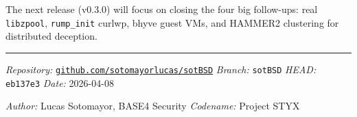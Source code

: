 \documentclass[11pt,a4paper]{article}
\begin{document}
The next release (v0.3.0) will focus on closing the four big
follow-ups: real \texttt{libzpool}, \texttt{rump\_init} curlwp,
bhyve guest VMs, and HAMMER2 clustering for distributed deception.

\vspace{1em}
\hrule
\vspace{0.5em}
\noindent\textit{Repository:}
\href{https://github.com/sotomayorlucas/sotBSD}{\texttt{github.com/sotomayorlucas/sotBSD}}
\quad \textit{Branch:} \texttt{sotBSD}
\quad \textit{HEAD:} \texttt{eb137e3}
\quad \textit{Date:} 2026-04-08

\noindent\textit{Author:} Lucas Sotomayor, BASE4 Security
\quad \textit{Codename:} Project STYX

\end{document}
